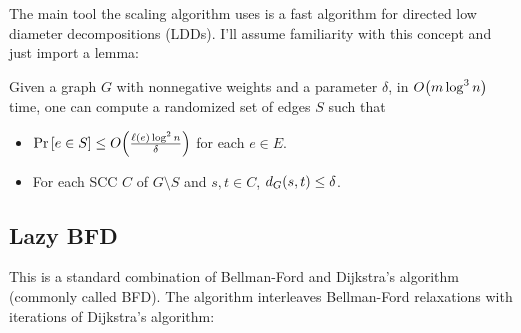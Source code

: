 \documentclass[12pt]{article}
\begin{document}
The main tool the scaling algorithm uses is a fast algorithm for directed low
diameter decompositions (LDDs). I'll assume familiarity with this concept and
just import a lemma:

\begin{lemma}
  \label{lemma:low-diameter-decomp}
  Given a graph $G$ with nonnegative weights and a parameter $\delta$, in
  $\bigO{m \log^3 n}$ time, one can compute a randomized set of edges $S$ such
  that
  \begin{itemize}
    \item $\Pr{e \in S} \leq \bigO{\frac{\len{e}\log^2n}{\delta}}$ for each
          $e \in E$.
    \item For each SCC $C$ of $G \setminus S$ and $s, t \in C$,
          $\dist_G{s, t} \leq \delta$.
  \end{itemize}
\end{lemma}

\subsection{Lazy BFD}

This is a standard combination of Bellman-Ford and Dijkstra's algorithm
(commonly called BFD). The algorithm interleaves Bellman-Ford relaxations with
iterations of Dijkstra's algorithm:
\end{document}
